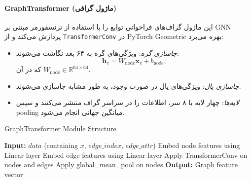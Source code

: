 \paragraph{GraphTransformer (ماژول گرافی)}
این ماژول گراف‌های فراخوانی توابع را با استفاده از ترنسفورمر مبتنی بر GNN پردازش می‌کند و از \texttt{TransformerConv} در PyTorch Geometric بهره می‌برد:
\begin{itemize}
    \item \textit{جاسازی گره}: ویژگی‌های گره به ۶۴ بعد نگاشت می‌شوند:
    \[
    \mathbf{h}_v = W_{\text{node}} \mathbf{x}_v + b_{\text{node}},
    \]
    که در آن \( W_{\text{node}} \in \mathbb{R}^{64 \times 64} \).
    \item \textit{جاسازی یال}: ویژگی‌های یال در صورت وجود، به طور مشابه جاسازی می‌شوند.
    \item \textit{لایه‌ها}: چهار لایه با ۸ سر، اطلاعات را در سراسر گراف منتشر می‌کنند و سپس pooling میانگین جهانی انجام می‌شود.
\end{itemize}
\begin{LTR}
\begin{algorithm}[h]
\caption{GraphTransformer Module Structure}
\begin{algorithmic}[1]
\STATE \textbf{Input:} $data$ (containing $x$, $edge\_index$, $edge\_attr$)
\STATE Embed node features using Linear layer
    \STATE Embed edge features using Linear layer
\ENDIF
{}
    \STATE Apply TransformerConv on nodes and edges
\ENDFOR
\STATE Apply global\_mean\_pool on nodes
\STATE \textbf{Output:} Graph feature vector
\end{algorithmic}
\end{algorithm}
\end{LTR}


